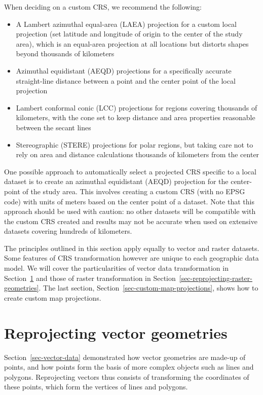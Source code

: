 \documentclass[
  letterpaper,
]{krantz}
\providecommand{\tightlist}{%
  \setlength{\itemsep}{0pt}\setlength{\parskip}{0pt}}\usepackage{longtable,booktabs,array}
\begin{document}
When deciding on a custom CRS, we recommend the following:

\begin{itemize}
\tightlist
\item
  A Lambert azimuthal equal-area (LAEA) projection for a custom local
  projection (set latitude and longitude of origin to the center of the
  study area), which is an equal-area projection at all locations but
  distorts shapes beyond thousands of kilometers
\item
  Azimuthal equidistant (AEQD) projections for a specifically accurate
  straight-line distance between a point and the center point of the
  local projection
\item
  Lambert conformal conic (LCC) projections for regions covering
  thousands of kilometers, with the cone set to keep distance and area
  properties reasonable between the secant lines
\item
  Stereographic (STERE) projections for polar regions, but taking care
  not to rely on area and distance calculations thousands of kilometers
  from the center
\end{itemize}

One possible approach to automatically select a projected CRS specific
to a local dataset is to create an azimuthal equidistant (AEQD)
projection for the center-point of the study area. This involves
creating a custom CRS (with no EPSG code) with units of meters based on
the center point of a dataset. Note that this approach should be used
with caution: no other datasets will be compatible with the custom CRS
created and results may not be accurate when used on extensive datasets
covering hundreds of kilometers.

The principles outlined in this section apply equally to vector and
raster datasets. Some features of CRS transformation however are unique
to each geographic data model. We will cover the particularities of
vector data transformation in
Section~\ref{sec-reprojecting-vector-geometries} and those of raster
transformation in Section~\ref{sec-reprojecting-raster-geometries}. The
last section, Section~\ref{sec-custom-map-projections}, shows how to
create custom map projections.

\section{Reprojecting vector
geometries}\label{sec-reprojecting-vector-geometries}

Section~\ref{sec-vector-data} demonstrated how vector geometries are
made-up of points, and how points form the basis of more complex objects
such as lines and polygons. Reprojecting vectors thus consists of
transforming the coordinates of these points, which form the vertices of
lines and polygons.
\end{document}
